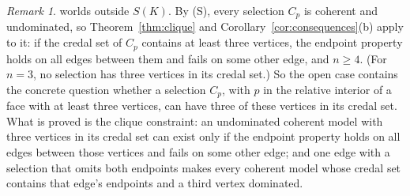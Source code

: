 \documentclass[11pt]{article}
\theoremstyle{definition}\newtheorem{definition}[theorem]{Definition}
\theoremstyle{remark}\newtheorem{remark}[theorem]{Remark}
\begin{document}
\begin{remark}
worlds outside $S(K)$. By (S), every selection $C_p$ is coherent and
undominated, so Theorem~\ref{thm:clique} and
Corollary~\ref{cor:consequences}(b) apply to it: if the credal set of $C_p$
contains at least three vertices, the endpoint property holds on all edges
between them and fails on some other edge, and $n\ge4$. (For $n=3$, no
selection has three vertices in its credal set.) So the open case contains
the concrete question whether a selection $C_p$, with $p$ in the relative
interior of a face with at least three vertices, can have three of these
vertices in its credal set. What is proved is the clique constraint: an
undominated coherent model with three vertices in its credal set can exist
only if the endpoint property holds on all edges between those vertices
and fails on some other edge; and one edge with a selection that omits both
endpoints makes every coherent model whose credal set contains that edge's
endpoints and a third vertex dominated.
\end{remark}
\end{document}
